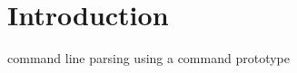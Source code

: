     

    \hypertarget{index_Introduction}{}\section{Introduction}\label{index_Introduction}
command line parsing using a command prototype

      